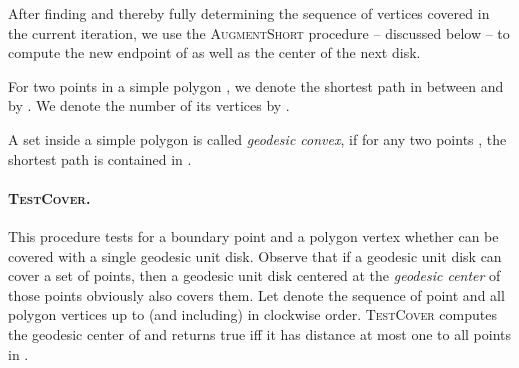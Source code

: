 \documentclass{llncs}
\begin{document}
After finding  and thereby fully determining the sequence of vertices covered in the current iteration, we use the \textsc{AugmentShort} procedure -- discussed below -- to compute the new endpoint  of  as well as the center of the next disk. \\

\vspace{-10px}

{\center
{}
}


\begin{definition}
For two points  in a simple polygon , we denote the shortest path in  between  and  by . We denote the number of its vertices by .
\end{definition}

\begin{definition}
A set  inside a simple polygon  is called \emph{geodesic convex}, if for any two points , the shortest path  is contained in . \end{definition}






\paragraph{\textbf{\textsc{TestCover}.}}
This procedure tests for a boundary point  and a polygon vertex  whether  can be covered with a single geodesic unit disk. Observe that if a geodesic unit disk {can cover} a set of points, then a geodesic unit disk centered at the \emph{geodesic center} of those points obviously  also covers them. Let  denote the sequence of point  and all polygon vertices up to (and including)  in clockwise order. \textsc{TestCover} computes the geodesic center of  and returns true iff it has distance at most one to all points in . \\
\end{document}
